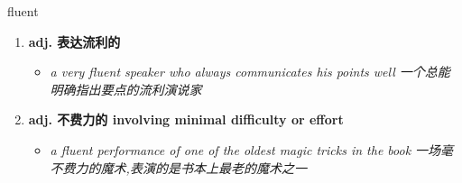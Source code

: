 
\begin{frame}
{\huge fluent}
\begin{center}
\begin{enumerate}\Large
  \item \textbf{adj. 表达流利的}
  \begin{itemize}
    \item \em{\Large{a very fluent speaker who always communicates his points well 一个总能明确指出要点的流利演说家}}
  \end{itemize}
  \item \textbf{adj. 不费力的 involving minimal difficulty or effort}
  \begin{itemize}
    \item \em{\Large{a fluent performance of one of the oldest magic tricks in the book 一场毫不费力的魔术,表演的是书本上最老的魔术之一}}
  \end{itemize}
\end{enumerate}
\end{center}
\end{frame}
